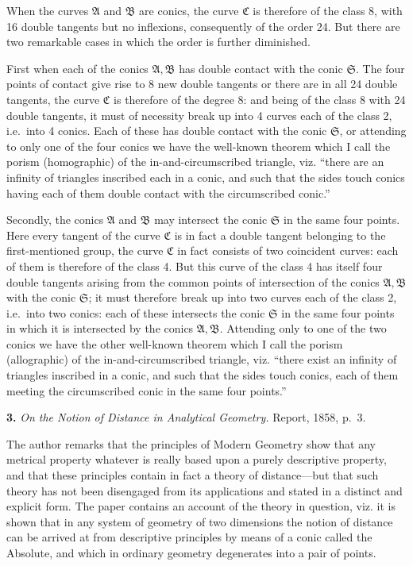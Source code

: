 \documentclass[11pt]{article}
\begin{document}
When the curves $\mathfrak{A}$ and $\mathfrak{B}$ are conics, the curve $\mathfrak{C}$ is therefore of the class 8, with 16 double tangents but no inflexions, consequently of the order 24. But there are two remarkable cases in which the order is further diminished.

First when each of the conics $\mathfrak{A}, \mathfrak{B}$ has double contact with the conic $\mathfrak{S}$. The four points of contact give rise to 8 new double tangents or there are in all 24 double tangents, the curve $\mathfrak{C}$ is therefore of the degree 8: and being of the class 8 with 24 double tangents, it must of necessity break up into 4 curves each of the class 2, i.e.~into 4 conics. Each of these has double contact with the conic $\mathfrak{S}$, or attending to only one of the four conics we have the well-known theorem which I call the porism (homographic) of the in-and-circumscribed triangle, viz. ``there are an infinity of triangles inscribed each in a conic, and such that the sides touch conics having each of them double contact with the circumscribed conic.''

Secondly, the conics $\mathfrak{A}$ and $\mathfrak{B}$ may intersect the conic $\mathfrak{S}$ in the same four points. Here every tangent of the curve $\mathfrak{C}$ is in fact a double tangent belonging to the first-mentioned group, the curve $\mathfrak{C}$ in fact consists of two coincident curves: each of them is therefore of the class 4. But this curve of the class 4 has itself four double tangents arising from the common points of intersection of the conics $\mathfrak{A}, \mathfrak{B}$ with the conic $\mathfrak{S}$; it must therefore break up into two curves each of the class 2, i.e.~into two conics: each of these intersects the conic $\mathfrak{S}$ in the same four points in which it is intersected by the conics $\mathfrak{A}, \mathfrak{B}$. Attending only to one of the two conics we have the other well-known theorem which I call the porism (allographic) of the in-and-circumscribed triangle, viz. ``there exist an infinity of triangles inscribed in a conic, and such that the sides touch conics, each of them meeting the circumscribed conic in the same four points.''

\medskip

\noindent\textbf{3.} \emph{On the Notion of Distance in Analytical Geometry.} Report, 1858, p.~3.

\medskip

The author remarks that the principles of Modern Geometry show that any metrical property whatever is really based upon a purely descriptive property, and that these principles contain in fact a theory of distance---but that such theory has not been disengaged from its applications and stated in a distinct and explicit form. The paper contains an account of the theory in question, viz. it is shown that in any system of geometry of two dimensions the notion of distance can be arrived at from descriptive principles by means of a conic called the Absolute, and which in ordinary geometry degenerates into a pair of points.
\end{document}

